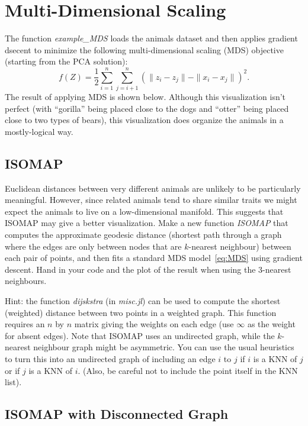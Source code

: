\documentclass{article}
\def\blu#1{{\color{blu}#1}}
\def\norm#1{\|#1\|}
\newcommand{\centerfig}[2]{\begin{center}\texttt{[image: a5f/\#2]}\end{center}}
\begin{document}
\section{Multi-Dimensional Scaling}

The function \emph{example\_MDS} loads the animals dataset and then applies gradient dsecent to minimize the following multi-dimensional scaling (MDS) objective (starting from the PCA solution):
\begin{equation}
\label{eq:MDS}
f(Z) =  \frac{1}{2}\sum_{i=1}^n\sum_{j=i+1}^n (  \norm{z_i - z_j} - \norm{x_i - x_j})^2.
\end{equation}
 The result of applying MDS is shown below.
Although this visualization isn't perfect (with ``gorilla'' being placed close to the dogs and ``otter'' being placed close to two types of bears), this visualization does organize the animals in a mostly-logical way.


\subsection{ISOMAP}

Euclidean distances between very different animals are unlikely to be particularly meaningful. However, since related animals tend to share similar traits we might expect the animals to live on a low-dimensional manifold. This suggests that ISOMAP may give a better visualization. Make a new function \emph{ISOMAP} that computes the approximate geodesic distance (shortest path through a graph where the edges are only between nodes that are $k$-nearest neighbour) between each pair of points, and then fits a standard MDS model~\eqref{eq:MDS} using gradient descent. \blu{Hand in your code and the plot of the result when using the $3$-nearest neighbours}.

Hint: the function \emph{dijskstra} (in \emph{misc.jl}) can be used to compute the shortest (weighted) distance between two points in a weighted graph. This function requires an $n$ by $n$ matrix giving the weights on each edge (use $\infty$ as the weight for absent edges). Note that ISOMAP uses an undirected graph, while the $k$-nearest neighbour graph might be asymmetric. You can use the usual heuristics to turn this into an undirected graph of including an edge $i$ to $j$ if $i$ is a KNN of $j$ or if $j$ is a KNN of $i$. (Also, be careful not to include the point itself in the KNN list).


\subsection{ISOMAP with Disconnected Graph}
\end{document}
